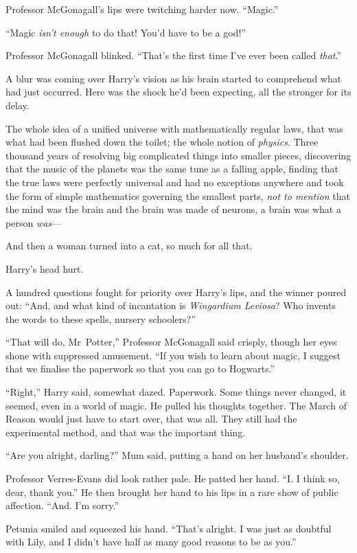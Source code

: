 Professor McGonagall’s lips were twitching harder now. “Magic.”

“Magic \emph{isn’t enough} to do that! You’d have to be a god!”

Professor McGonagall blinked. “That’s the first time I’ve ever been called
\emph{that}.”

A blur was coming over Harry’s vision as his brain started to comprehend what 
had just occurred. Here was the shock he’d been expecting, all the stronger 
for its delay.

The whole idea of a unified universe with mathematically
regular laws, that was what had been flushed down the toilet; the whole notion
of \emph{physics}. Three thousand years of resolving big complicated things
into smaller pieces, discovering that the music of the planets was the same
tune as a falling apple, finding that the true laws were perfectly universal
and had no exceptions anywhere and took the form of simple mathematics governing the
smallest parts, \emph{not to mention} that the mind was the brain and the brain
was made of neurons, a brain was what a person \emph{was}—

And then a woman turned into a cat, so much for all that.

Harry’s head hurt.

A hundred questions fought for priority over Harry’s lips, and the winner poured
out: “And, and what kind of incantation is \emph{Wingardium Leviosa}? Who
invents the words to these spells, nursery schoolers?”

“That will do, Mr~Potter,” Professor McGonagall said crisply, though her eyes
shone with suppressed amusement. “If you wish to learn about magic, I suggest
that we finalise the paperwork so that you can go to Hogwarts.”

“Right,” Harry said, somewhat dazed. Paperwork. Some things
never changed, it seemed, even in a world of magic.
He pulled his thoughts together. The March
of Reason would just have to start over, that was all.
They still had the experimental method, and that was the important thing.

“Are you alright, darling?” Mum said, putting a hand on her
husband’s shoulder.

Professor Verres-Evans did look rather pale. He patted her
hand. “I. I think so, dear, thank you.” He then brought
her hand to his lips in a rare show of public affection.
“And. I’m sorry.”

Petunia smiled and squeezed his hand. “That’s alright. I
was just as doubtful with Lily, and I didn’t have half as
many good reasons to be as you.”

